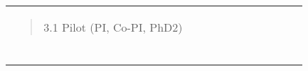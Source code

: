 \begin{longtable}[]{@{}lllllllllll@{}}
\begin{minipage}[t]{0.07\columnwidth}
\begin{quote}
3.1 Pilot (PI, Co-PI, PhD2) \end{quote}\strut \end{minipage} & \begin{minipage}[t]{0.07\columnwidth}\raggedright \strut \end{minipage} & \begin{minipage}[t]{0.07\columnwidth}\raggedright \strut \end{minipage} & \begin{minipage}[t]{0.07\columnwidth}\raggedright \strut \end{minipage} & \begin{minipage}[t]{0.07\columnwidth}\raggedright \strut \end{minipage} & \begin{minipage}[t]{0.07\columnwidth}\raggedright \strut \end{minipage} & \begin{minipage}[t]{0.07\columnwidth}\raggedright \strut \end{minipage} & \begin{minipage}[t]{0.07\columnwidth}\raggedright \strut \end{minipage} & \begin{minipage}[t]{0.07\columnwidth}\raggedright \strut \end{minipage} & \begin{minipage}[t]{0.07\columnwidth}\raggedright \strut \end{minipage} & \begin{minipage}[t]{0.07\columnwidth}\raggedright \strut \end{minipage}\tabularnewline \begin{minipage}[t]{0.07\columnwidth}\raggedright \begin{quote}

\end{quote}
\end{minipage}
\end{longtable}
